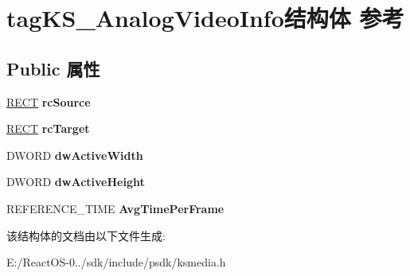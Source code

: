 \hypertarget{structtag_k_s___analog_video_info}{}\section{tag\+K\+S\+\_\+\+Analog\+Video\+Info结构体 参考}
\label{structtag_k_s___analog_video_info}
\subsection*{Public 属性}
\begin{DoxyCompactItemize}
\item 
\mbox{\label{structtag_k_s___analog_video_info_a8b911b5afe5a34e801d63ef8392188cf}} 
\hyperlink{structtag_r_e_c_t}{R\+E\+CT} {\bfseries rc\+Source}
\item 
\mbox{\label{structtag_k_s___analog_video_info_a50fa6c382f127c5b0337a96ccdfa0e9e}} 
\hyperlink{structtag_r_e_c_t}{R\+E\+CT} {\bfseries rc\+Target}
\item 
\mbox{\label{structtag_k_s___analog_video_info_add0600d5b3d93c3e13d66c710aa15e6b}} 
D\+W\+O\+RD {\bfseries dw\+Active\+Width}
\item 
\mbox{\label{structtag_k_s___analog_video_info_a7e3a7d5bebd089fbd6a4090b0b493be4}} 
D\+W\+O\+RD {\bfseries dw\+Active\+Height}
\item 
\mbox{\label{structtag_k_s___analog_video_info_ac7e8df9002937184ab7b51dfb2aff3dd}} 
R\+E\+F\+E\+R\+E\+N\+C\+E\+\_\+\+T\+I\+ME {\bfseries Avg\+Time\+Per\+Frame}
\end{DoxyCompactItemize}


该结构体的文档由以下文件生成\+:\begin{DoxyCompactItemize}
\item 
E\+:/\+React\+O\+S-\/0../sdk/include/psdk/ksmedia.\+h\end{DoxyCompactItemize}

